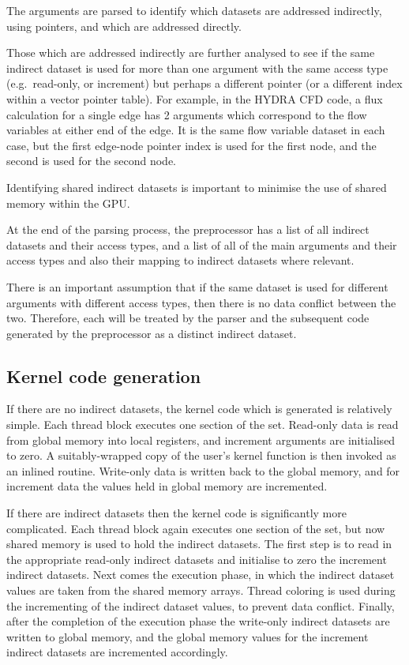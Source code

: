 \documentclass[12pt]{article}
\begin{document}
The arguments are parsed to identify which datasets are addressed 
indirectly, using pointers, and which are addressed directly.

Those which are addressed indirectly are further analysed to see
if the same indirect dataset is used for more than one argument
with the same access type (e.g.~read-only, or increment) but
perhaps a different pointer (or a different index within a 
vector pointer table).  For example, in the HYDRA CFD code, 
a flux calculation for a single edge has 2 arguments which 
correspond to the flow variables at either end of the edge. 
It is the same flow variable dataset in each case, but the 
first edge-node pointer index is used for the first node, and 
the second is used for the second node.

Identifying shared indirect datasets is important to minimise
the use of shared memory within the GPU.

At the end of the parsing process, the preprocessor has a 
list of all indirect datasets and their access types, and a 
list of all of the main arguments and their access types and 
also their mapping to indirect datasets where relevant.

There is an important assumption that if the same dataset is
used for different arguments with different access types, then
there is no data conflict between the two.  Therefore, each will
be treated by the parser and the subsequent code generated by 
the preprocessor as a distinct indirect dataset.

\subsection{Kernel code generation}

If there are no indirect datasets, the kernel code which is 
generated is relatively simple.  Each thread block executes
one section of the set.  Read-only data is read from global 
memory into local registers, and increment arguments are 
initialised to zero.  A suitably-wrapped copy of the user's 
kernel function is then invoked as an inlined routine.  
Write-only data is written back to the global memory, and
for increment data the values held in global memory are 
incremented.


If there are indirect datasets then the kernel code is 
significantly more complicated.  Each thread block again
executes one section of the set, but now shared memory
is used to hold the indirect datasets.  The first step 
is to read in the appropriate read-only indirect datasets 
and initialise to zero the increment indirect datasets.
Next comes the execution phase, in which the indirect 
dataset values are taken from the shared memory arrays.
Thread coloring is used during the incrementing of the 
indirect dataset values, to prevent data conflict.
Finally, after the completion of the execution phase
the write-only indirect datasets are written to global 
memory, and the global memory values for the increment 
indirect datasets are incremented accordingly.
\end{document}
